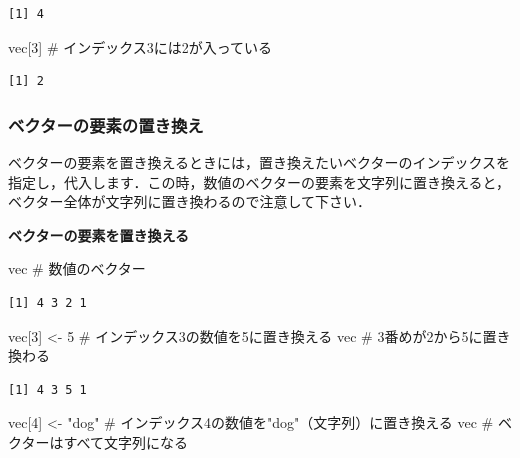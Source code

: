\documentclass[
  letterpaper,
  DIV=11,
  numbers=noendperiod]{scrreprt}
\newenvironment{Shaded}{\begin{snugshade}}{\end{snugshade}}
\newcommand{\CommentTok}[1]{\textcolor[rgb]{0.37,0.37,0.37}{#1}}
\newcommand{\DecValTok}[1]{\textcolor[rgb]{0.68,0.00,0.00}{#1}}
\newcommand{\NormalTok}[1]{\textcolor[rgb]{0.00,0.23,0.31}{#1}}
\newcommand{\OtherTok}[1]{\textcolor[rgb]{0.00,0.23,0.31}{#1}}
\newcommand{\StringTok}[1]{\textcolor[rgb]{0.13,0.47,0.30}{#1}}
\begin{document}
\begin{verbatim}
[1] 4
\end{verbatim}

\begin{Shaded}
\begin{Highlighting}[]
\NormalTok{vec[}\DecValTok{3}\NormalTok{] }\CommentTok{\# インデックス3には2が入っている}
\end{Highlighting}
\end{Shaded}

\begin{verbatim}
[1] 2
\end{verbatim}

\hypertarget{ux30d9ux30afux30bfux30fcux306eux8981ux7d20ux306eux7f6eux304dux63dbux3048}{%
\subsubsection{ベクターの要素の置き換え}\label{ux30d9ux30afux30bfux30fcux306eux8981ux7d20ux306eux7f6eux304dux63dbux3048}}

ベクターの要素を置き換えるときには，置き換えたいベクターのインデックスを指定し，代入します．この時，数値のベクターの要素を文字列に置き換えると，ベクター全体が文字列に置き換わるので注意して下さい．

\textbf{ベクターの要素を置き換える}

\begin{Shaded}
\begin{Highlighting}[]
\NormalTok{vec }\CommentTok{\# 数値のベクター}
\end{Highlighting}
\end{Shaded}

\begin{verbatim}
[1] 4 3 2 1
\end{verbatim}

\begin{Shaded}
\begin{Highlighting}[]
\NormalTok{vec[}\DecValTok{3}\NormalTok{] }\OtherTok{\textless{}{-}} \DecValTok{5} \CommentTok{\# インデックス3の数値を5に置き換える}
\NormalTok{vec }\CommentTok{\# 3番めが2から5に置き換わる}
\end{Highlighting}
\end{Shaded}

\begin{verbatim}
[1] 4 3 5 1
\end{verbatim}

\begin{Shaded}
\begin{Highlighting}[]
\NormalTok{vec[}\DecValTok{4}\NormalTok{] }\OtherTok{\textless{}{-}} \StringTok{"dog"} \CommentTok{\# インデックス4の数値を"dog"（文字列）に置き換える}
\NormalTok{vec }\CommentTok{\# ベクターはすべて文字列になる}
\end{Highlighting}
\end{Shaded}
\end{document}
